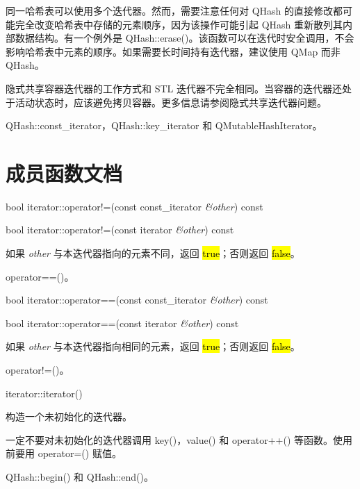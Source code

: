 同一哈希表可以使用多个迭代器。然而，需要注意任何对 QHash 的直接修改都可能完全改变哈希表中存储的元素顺序，因为该操作可能引起 QHash 重新散列其内部数据结构。有一个例外是 QHash::erase()。该函数可以在迭代时安全调用，不会影响哈希表中元素的顺序。如果需要长时间持有迭代器，建议使用 QMap 而非 QHash。

\begin{notice}[警告]
隐式共享容器迭代器的工作方式和 STL 迭代器不完全相同。当容器的迭代器还处于活动状态时，应该避免拷贝容器。更多信息请参阅隐式共享迭代器问题。
\end{notice}
 

\begin{notice}[另请参阅]
QHash::const\_iterator，QHash::key\_iterator 和
QMutableHashIterator。
\end{notice}

\section{成员函数文档}

bool iterator::operator!=(const const\_iterator \emph{\&other}) const

bool iterator::operator!=(const iterator \emph{\&other}) const

如果 \emph{other} 与本迭代器指向的元素不同，返回 \hl{true}；否则返回 \hl{false}。

\begin{notice}[另请参阅]
operator==()。
\end{notice}
 

bool iterator::operator==(const const\_iterator \emph{\&other}) const

bool iterator::operator==(const iterator \emph{\&other}) const

如果 \emph{other} 与本迭代器指向相同的元素，返回 \hl{true}；否则返回 \hl{false}。



\begin{notice}[另请参阅]
operator!=()。
\end{notice}

iterator::iterator()

构造一个未初始化的迭代器。

一定不要对未初始化的迭代器调用 key()，value() 和 operator++() 等函数。使用前要用 operator=() 赋值。


\begin{notice}[另请参阅]
 QHash::begin() 和 QHash::end()。
\end{notice}

